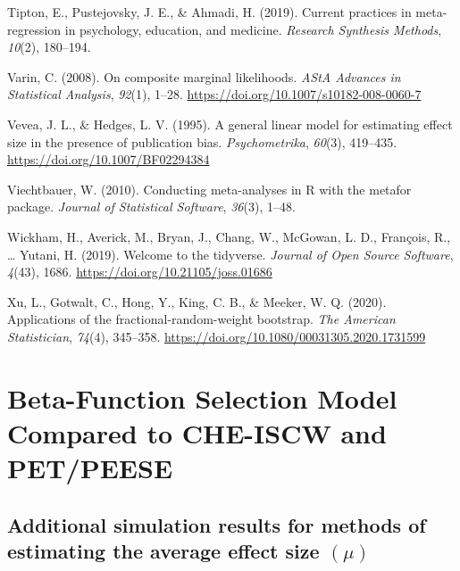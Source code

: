 \documentclass[
  american,
  man, donotrepeattitle,floatsintext]{apa7}
\newlength{\cslhangindent}
\newenvironment{CSLReferences}[2] %
 {\begin{list}{}{%
  \setlength{\itemindent}{0pt}
  \setlength{\leftmargin}{0pt}
  \setlength{\parsep}{0pt}
  \ifodd #1
   \setlength{\leftmargin}{\cslhangindent}
   \setlength{\itemindent}{-1\cslhangindent}
  \fi
  \setlength{\itemsep}{#2\baselineskip}}}
 {\end{list}}
\begin{document}
\begin{CSLReferences}{1}{0}
Tipton, E., Pustejovsky, J. E., \& Ahmadi, H. (2019). Current practices in meta-regression in psychology, education, and medicine. \emph{Research Synthesis Methods}, \emph{10}(2), 180--194.

Varin, C. (2008). On composite marginal likelihoods. \emph{AStA Advances in Statistical Analysis}, \emph{92}(1), 1--28. \url{https://doi.org/10.1007/s10182-008-0060-7}

Vevea, J. L., \& Hedges, L. V. (1995). A general linear model for estimating effect size in the presence of publication bias. \emph{Psychometrika}, \emph{60}(3), 419--435. \url{https://doi.org/10.1007/BF02294384}

Viechtbauer, W. (2010). {Conducting meta-analyses in R with the metafor package}. \emph{Journal of Statistical Software}, \emph{36}(3), 1--48.

Wickham, H., Averick, M., Bryan, J., Chang, W., McGowan, L. D., François, R., \ldots{} Yutani, H. (2019). Welcome to the {tidyverse}. \emph{Journal of Open Source Software}, \emph{4}(43), 1686. \url{https://doi.org/10.21105/joss.01686}

Xu, L., Gotwalt, C., Hong, Y., King, C. B., \& Meeker, W. Q. (2020). Applications of the fractional-random-weight bootstrap. \emph{The American Statistician}, \emph{74}(4), 345--358. \url{https://doi.org/10.1080/00031305.2020.1731599}

\end{CSLReferences}

\endgroup

\appendix


\section{Beta-Function Selection Model Compared to CHE-ISCW and PET/PEESE}\label{beta-function-selection-model-compared-to-che-iscw-and-petpeese-1}

\subsection{\texorpdfstring{Additional simulation results for methods of estimating the average effect size \((\mu)\)}{Additional simulation results for methods of estimating the average effect size (\textbackslash mu)}}\label{mu-simulation-results-main}
\end{document}

